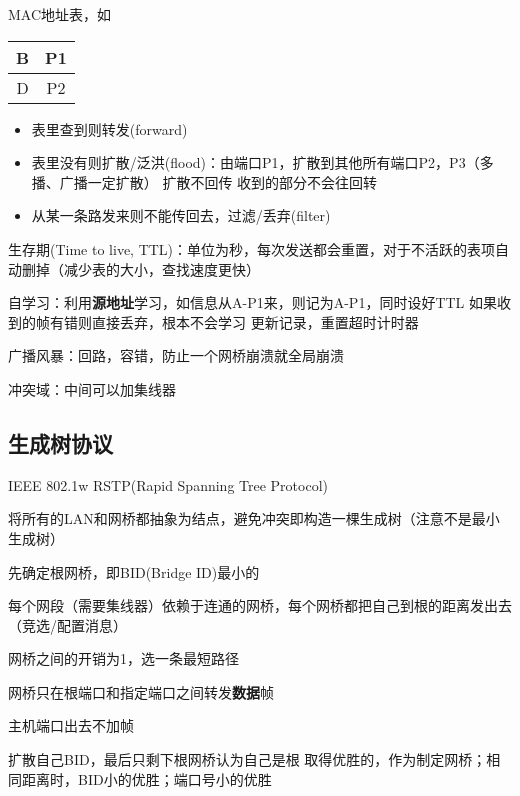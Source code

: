 MAC地址表，如
\begin{center}
\begin{tabular}{|c|c|}\hline
	B & P1\\\hline
	D & P2\\\hline
\end{tabular}
\end{center}
\begin{itemize}
	\item 表里查到则转发(forward)
	\item 表里没有则扩散/泛洪(flood)：由端口P1，扩散到其他所有端口P2，P3（多播、广播一定扩散）
	扩散不回传
	收到的部分不会往回转
	\item 从某一条路发来则不能传回去，过滤/丢弃(filter)
\end{itemize}

生存期(Time to live, TTL)：单位为秒，每次发送都会重置，对于不活跃的表项自动删掉（减少表的大小，查找速度更快）

自学习：利用\textbf{源地址}学习，如信息从A-P1来，则记为A-P1，同时设好TTL
如果收到的帧有错则直接丢弃，根本不会学习
更新记录，重置超时计时器

广播风暴：回路，容错，防止一个网桥崩溃就全局崩溃
\begin{center}
\end{center}

冲突域：中间可以加集线器

\subsection{生成树协议}
IEEE 802.1w RSTP(Rapid Spanning Tree Protocol)


将所有的LAN和网桥都抽象为结点，避免冲突即构造一棵生成树（注意不是最小生成树）

先确定根网桥，即BID(Bridge ID)最小的

每个网段（需要集线器）依赖于连通的网桥，每个网桥都把自己到根的距离发出去（竞选/配置消息）

网桥之间的开销为1，选一条最短路径

网桥只在根端口和指定端口之间转发\textbf{数据}帧

主机端口出去不加帧

扩散自己BID，最后只剩下根网桥认为自己是根
取得优胜的，作为制定网桥；相同距离时，BID小的优胜；端口号小的优胜


